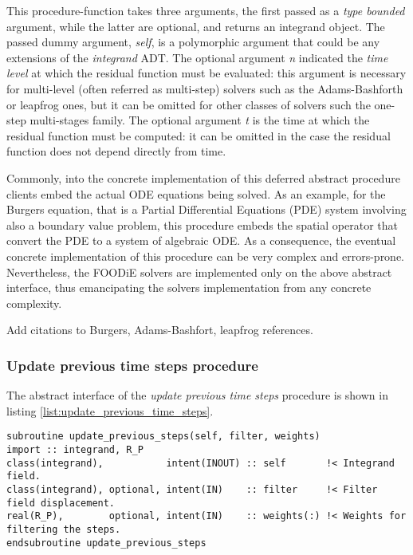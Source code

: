 \documentclass[pdftex,preprint,3p,times,numbers]{elsarticle}
\begin{document}
This procedure-function takes three arguments, the first passed as a \emph{type bounded} argument, while the latter are optional, and returns an integrand object. The passed dummy argument, \emph{self}, is a polymorphic argument that could be any extensions of the \emph{integrand} ADT. The optional argument \emph{n} indicated the \emph{time level} at which the residual function must be evaluated: this argument is necessary for multi-level (often referred as multi-step) solvers such as the Adams-Bashforth or leapfrog ones, but it can be omitted for other classes of solvers such the one-step multi-stages family. The optional argument \emph{t} is the {time} at which the residual function must be computed: it can be omitted in the case the residual function does not depend directly from time.

Commonly, into the concrete implementation of this deferred abstract procedure clients embed the actual ODE equations being solved. As an example, for the Burgers equation, that is a Partial Differential Equations (PDE) system involving also a boundary value problem, this procedure embeds the spatial operator that convert the PDE to a system of algebraic ODE. As a consequence, the eventual concrete implementation of this procedure can be very complex and errors-prone. Nevertheless, the FOODiE solvers are implemented only on the above abstract interface, thus emancipating the solvers implementation from any concrete complexity.

{\color{red} Add citations to Burgers, Adams-Bashfort, leapfrog references.}

\subsubsection{Update previous time steps procedure}

The abstract interface of the \emph{update previous time steps} procedure is shown in listing \ref{list:update_previous_time_steps}.

\begin{lstlisting}[firstnumber=1,style=code,caption={update previous time steps procedure interface},label={list:update_previous_time_steps}]
subroutine update_previous_steps(self, filter, weights)
import :: integrand, R_P
class(integrand),           intent(INOUT) :: self       !< Integrand field.
class(integrand), optional, intent(IN)    :: filter     !< Filter field displacement.
real(R_P),        optional, intent(IN)    :: weights(:) !< Weights for filtering the steps.
endsubroutine update_previous_steps
\end{lstlisting}
\end{document}
